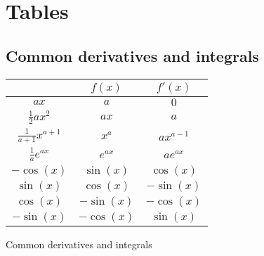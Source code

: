 \section{Tables}

\subsection{Common derivatives and integrals}
\begin{booktable}
  \begin{tabular}{|ccc|}
    \hline
    \rowcolor{headingbg}
    \multicolumn{1}{|c}{\textbf{$\int f(x) \,dx$}} &
      \multicolumn{1}{c}{\textbf{$f(x)$}} &
      \multicolumn{1}{c|}{\textbf{$f'(x)$}} \\
    \hline
    $ax$ & $a$ & $0$ \\
    $\frac{1}{2}ax^2$ & $ax$ & $a$ \\
    $\frac{1}{a + 1}x^{a + 1}$ & $x^a$ & $ax^{a - 1}$ \\
    $\frac{1}{a}e^{ax}$ & $e^{ax}$ & $ae^{ax}$ \\
    $-\cos(x)$ & $\sin(x)$ & $\cos(x)$ \\
    $\sin(x)$ & $\cos(x)$ & $-\sin(x)$ \\
    $\cos(x)$ & $-\sin(x)$ & $-\cos(x)$ \\
    $-\sin(x)$ & $-\cos(x)$ & $\sin(x)$ \\
    \hline
  \end{tabular}
  \caption{Common derivatives and integrals}
  \label{tab:common_derivatives_and_integrals}
\end{booktable}
